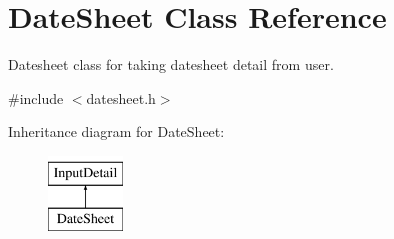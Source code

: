 \hypertarget{classDateSheet}{\section{Date\-Sheet Class Reference}
\label{classDateSheet}
}


Datesheet class for taking datesheet detail from user.  




{\ttfamily \#include $<$datesheet.\-h$>$}

Inheritance diagram for Date\-Sheet\-:\begin{figure}[H]
\begin{center}
\leavevmode
\includegraphics[height=2.000000cm]{classDateSheet}
\end{center}
\end{figure}
